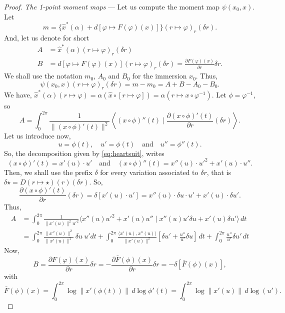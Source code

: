 \documentclass[10pt,reqno,twoside]{amsart}
\theoremstyle{plain}
\theoremstyle{definition}
\begin{document}
\begin{proof}
    \emph{The 1-point moment maps} --- Let us compute the moment map $\psi(x_0,x)$.
    Let
    \[
    m = \{\hat{x}^*(\alpha) + d[\varphi \mapsto F(\varphi)(x)]\}(r \mapsto \varphi)_r(\delta r).
    \]
    And,
    let us denote for short
    \begin{align*}
      {A} &= \hat{x}^*(\alpha)(r \mapsto \varphi)_r(\delta r) \\
      {B} &= d[\varphi \mapsto F(\varphi)(x)](r \mapsto \varphi)_r(\delta r) = \frac{\partial F(\varphi)(x)}{\partial r} \delta r.
    \end{align*}
    We shall use the notation $m_0$,
    $A_0$ and $B_0$ for the immersion $x_0$.
    Thus,
    \[
    \psi(x_0,x)(r \mapsto \varphi)_r(\delta r) = m - m_0 = A + B - A_0 - B_0.
    \]
    We have,
    $ \hat{x}^*(\alpha)(r \mapsto \varphi) = \alpha(\hat{x} \circ [r \mapsto \varphi]) = \alpha(r \mapsto x \circ \varphi^{-1})$.
    Let $\phi = \varphi^{-1}$,
    so
    \[
    A = \int_0^{2\pi} \frac{1}{\lVert (x \circ \phi)'(t)\rVert^2} \left\langle (x \circ \phi)''(t) \mid \frac{\partial (x \circ \phi)'(t)}{\partial r}(\delta r) \right\rangle.
    \]
    Let us introduce now,
    \[
    u = \phi(t), \quad u'=\phi(t) \quad\text{and}\quad u'' = \phi''(t).
    \]
    So,
    the decomposition given by \eqref{eq:heartsuit},
    writes
    \[
    (x \circ \phi)'(t) = x'(u) \cdot u' \quad\text{and}\quad (x \circ \phi)''(t) = x''(u) \cdot u'^2 + x'(u) \cdot u''.
    \]
    Then,
    we shall use the prefix $\delta$ for every variation associated to $\delta r$,
    that is $\delta \star = D(r \mapsto \star)(r)(\delta r)$.
    So,
    \[
    \frac{\partial (x \circ \phi)'(t)}{\partial r}(\delta r) = \delta[x'(u) \cdot u'] = x''(u) \cdot \delta u \cdot u' + x'(u) \cdot \delta u'.
    \]
    Thus,
    \begin{align*}
      {A} &= \int_0^{2\pi} \frac{1}{\lVert x'(u)\rVert^2 u'^2} \langle x''(u) u'^2 + x'(u) u'' \mid x''(u) u' \delta u + x'(u) \delta u' \rangle \, dt \\
      &= \int_0^{2\pi} \frac{\lVert x''(u)\rVert^2}{\lVert x'(u)\rVert^2} \ \delta u \ u' dt + \int_0^{2\pi} \frac{\langle x'(u), x''(u)\rangle}{\lVert x'(u)\rVert^2} \left[ \delta u' + \frac{u''}{u'} \delta u \right] \, dt + \int_0^{2\pi} \frac{u''}{u'} \delta u' \, dt
    \end{align*}
    Now,
    \[
    B = \frac{\partial F(\varphi)(x)}{\partial r} \delta r = - \frac{\partial \bar{F}(\phi)(x)}{\partial r} \delta r = - \delta [\bar{F}(\phi)(x)],
    \]
    with
    \[
    \bar{F}(\phi)(x) = \int_0^{2\pi} \log \lVert x'(\phi(t))\rVert \, d \log \phi'(t) = \int_0^{2\pi} \log\lVert x'(u)\rVert \, d\log(u').
\]
\end{proof}
\end{document}
